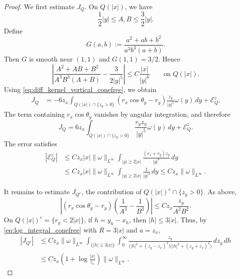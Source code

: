 \documentclass[reqno,11pt]{amsart}
\begin{document}
\begin{proof}
We first estimate \(J_{Q}\). On \(Q(|x|)\), we have
\[
    \frac12|y|\le A,B\le \frac32|y|.
\]
Define
\[
    G(a,b):=\frac{a^2+ab+b^2}{a^3b^3(a+b)}.
\]
Then \(G\) is smooth near \((1,1)\) and \(G(1,1)=3/2\). Hence
\[
    \left|
    \frac{A^2+AB+B^2}{A^3B^3(A+B)}
    -
    \frac{3}{2|y|^5}
    \right|
    \le
    C\frac{|x|}{|y|^6}
    \qquad\text{on }Q(|x|).
\]
Using \eqref{eq:diff_kernel_vertical_conefree}, we obtain
\[
\begin{aligned}
    J_{Q}
    &=
    -6z_x
    \int_{Q(|x|)\cap\{z_y>0\}}
    (r_x\cos\theta_y-r_y)
    \frac{z_y}{|y|^5}
    \omega(y) \,dy
    +\mathcal{E}_{Q}^z .
\end{aligned}
\]
The term containing \(r_x\cos\theta_y\) vanishes by angular integration, and therefore
\[
    J_{Q}
    =
    6z_x
    \int_{Q(|x|)\cap\{z_y>0\}}
    \frac{r_yz_y}{|y|^5}\omega(y) \,dy
    +\mathcal{E}_{Q}^z .
\]
The error satisfies
\[
\begin{aligned}
    |\mathcal{E}_{Q}^z|
    &\le
    C z_x |x| \|\omega\|_{L^\infty}
    \int_{|y|\ge 2|x|}
    \frac{(r_x+r_y)z_y}{|y|^6}\,dy
    \\
    &\le
    C z_x |x| \|\omega\|_{L^\infty}
    \int_{|y|\ge 2|x|}
    \frac{1}{|y|^4}\,dy
    \le
    C z_x\|\omega\|_{L^\infty}.
\end{aligned}
\]


It remains to estimate \(J_{Q^c}\), the contribution of
\(Q(|x|)^c\cap\{z_y>0\}\). As above,
\[
    \left|
    (r_x\cos\theta_y-r_y)
    \left(\frac1{A^3}-\frac1{B^3}\right)
    \right|
    \le
    C z_x
    \frac{z_y}{A^2B^2}.
\]
On \(Q(|x|)^c=\{r_y<2|x|\}\), if \(h=y_h-x_h\), then \(|h|\le 3|x|\). Thus,
by \eqref{eq:log_integral_conefree} with \(R=3|x|\) and \(a=z_x\),
\[
\begin{aligned}
    |J_{Q^c}|
    &\le
    C z_x\|\omega\|_{L^\infty}
    \int_{\{|h|\le 3|x|\}}\int_0^\infty
    \frac{z_y}
    {\big(|h|^2+(z_y-z_x)^2\big)
     \big(|h|^2+(z_y+z_x)^2\big)}
    \,dz_y\,dh
    \\
    &\le
    C z_x
    \left(1+\log\frac{|x|}{z_x}\right)
    \|\omega\|_{L^\infty}.
\end{aligned}
\]


\end{proof}
\end{document}
